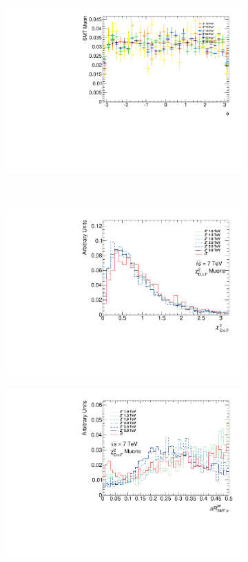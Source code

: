 \begin{figure}
\begin{subfigure}{0.49\linewidth}
\includegraphics[width=\textwidth]{PartBoosted/Plots/h_smt_phi.pdf}
\end{subfigure}
~
\begin{subfigure}{0.49\linewidth}
\includegraphics[width=\textwidth]{PartBoosted/Plots/h_smt_chi2.pdf}
\end{subfigure}

\begin{subfigure}{\linewidth}
\includegraphics[width=\textwidth]{PartBoosted/Plots/h_smt_jet_dr.pdf}
\end{subfigure}


\end{figure}
